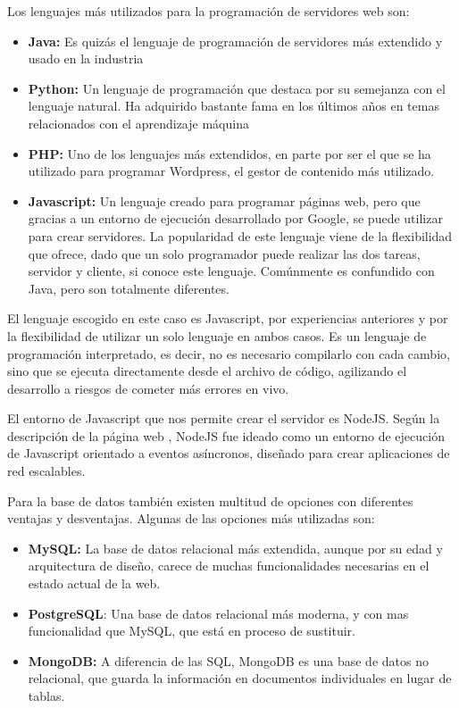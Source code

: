 Los lenguajes más utilizados para la programación de servidores web son:
\begin{itemize}
\item \textbf{Java:} Es quizás el lenguaje de programación de servidores más extendido y usado en la industria
\item \textbf{Python:} Un lenguaje de programación que destaca por su semejanza con el lenguaje natural. Ha adquirido bastante fama en los últimos años en temas relacionados con el aprendizaje máquina
\item \textbf{PHP:} Uno de los lenguajes más extendidos, en parte por ser el que se ha utilizado para programar Wordpress, el gestor de contenido más utilizado.
\item \textbf{Javascript:} Un lenguaje creado para programar páginas web, pero que gracias a un entorno de ejecución desarrollado por Google, se puede utilizar para crear servidores. La popularidad de este lenguaje viene de la flexibilidad que ofrece, dado que un solo programador puede realizar las dos tareas, servidor y cliente, si conoce este lenguaje. Comúnmente es confundido con Java, pero son totalmente diferentes.
\end{itemize}

El lenguaje escogido en este caso es Javascript, por experiencias anteriores y por la flexibilidad de utilizar un solo lenguaje en ambos casos. Es un lenguaje de programación interpretado, es decir, no es necesario compilarlo con cada cambio, sino que se ejecuta directamente desde el archivo de código, agilizando el desarrollo a riesgos de cometer más errores en vivo. 

El entorno de Javascript que nos permite crear el servidor es NodeJS. Según la descripción de la página web \cite{node_website}, NodeJS fue ideado como un entorno de ejecución de Javascript orientado a eventos asíncronos, diseñado para crear aplicaciones de red escalables.

Para la base de datos también existen multitud de opciones con diferentes ventajas y desventajas. Algunas de las opciones más utilizadas son:
\begin{itemize}
\item \textbf{MySQL:} La base de datos relacional más extendida, aunque por su edad y arquitectura de diseño, carece de muchas funcionalidades necesarias en el estado actual de la web.
\item \textbf{PostgreSQL}: Una base de datos relacional más moderna, y con mas funcionalidad que MySQL, que está en proceso de sustituir.
\item \textbf{MongoDB:} A diferencia de las SQL, MongoDB es una base de datos no relacional, que guarda la información en documentos individuales en lugar de tablas.
\end{itemize}

